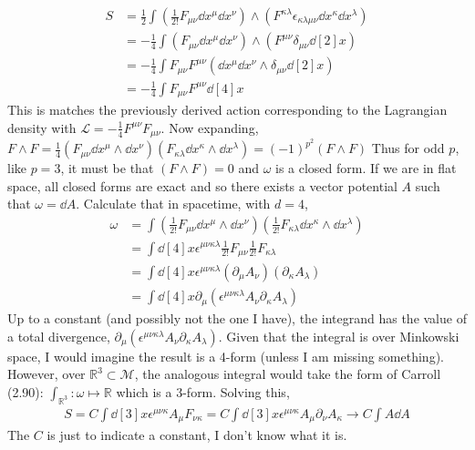 \documentclass[10pt]{scrartcl}
\begin{document}
\begin{align}
S &= \frac{1}{2}\int \left(\frac{1}{2!}F_{\mu\nu}\dd{x^{\mu}}\dd{x^{\nu}}\right) \wedge \left(F^{\kappa\lambda} \epsilon_{\kappa\lambda\mu\nu}\dd{x^{\kappa}}\dd{x^{\lambda}}\right)\\
&= -\frac{1}{4}\int \left(F_{\mu\nu}\dd{x^{\mu}}\dd{x^{\nu}}\right) \wedge \left(F^{\mu\nu}\delta_{\mu\nu}\dd[2]{x}\right) \\
&= -\frac{1}{4}\int F_{\mu\nu}F^{\mu\nu} (\dd{x^{\mu}}\dd{x^{\nu}}\wedge \delta_{\mu\nu}\dd[2]{x})\\
&= -\frac{1}{4}\int F_{\mu\nu}F^{\mu\nu}\dd[4]{x}
\end{align}
This is matches the previously derived action corresponding to the Lagrangian density with $\mathcal{L} = - \frac{1}{4}F^{\mu\nu}F_{\mu\nu}$. Now expanding, $F\wedge F = \frac{1}{4}(F_{\mu\nu}\dd{x^\mu}\wedge\dd{x^{\nu}})	(F_{\kappa\lambda}\dd{x^\kappa}\wedge\dd{x^{\lambda}})= (-1)^{p^2}(F\wedge F)$
Thus for odd $p$, like $p=3$, it must be that $(F\wedge F) = 0$ and $\omega$ is a closed form. If we are in flat space, all closed forms are exact and so there exists a vector potential $A$ such that $\omega=\dd{A}$. Calculate that in spacetime, with $d=4$, 
\begin{align}
\omega &= \int(\frac{1}{2!}F_{\mu\nu}\dd{x^\mu}\wedge\dd{x^{\nu}})	(\frac{1}{2!}F_{\kappa\lambda}\dd{x^\kappa}\wedge\dd{x^{\lambda}})\\
&= \int \dd[4]{x}\epsilon^{\mu\nu\kappa\lambda}\frac{1}{2!}F_{\mu\nu}\frac{1}{2!}F_{\kappa\lambda}\\
&= \int \dd[4]{x}\epsilon^{\mu\nu\kappa\lambda}(\partial_\mu A_\nu)(\partial_\kappa A_\lambda)\\
&= \int \dd[4]{x}\partial_\mu(\epsilon^{\mu\nu\kappa\lambda}A_\nu\partial_\kappa A_\lambda)
\end{align}
Up to a constant (and possibly not the one I have), the integrand has the value of a total divergence, $\partial_\mu(\epsilon^{\mu\nu\kappa\lambda} A_\nu \partial_\kappa A_\lambda)$. Given that the integral is over Minkowski space, I would imagine the result is a 4-form (unless I am missing something). However, over $\mathbb{R}^3\subset \mathcal{M}$, the analogous integral would take the form of Carroll (2.90): $\int_{\mathbb{R}^3}:\omega\mapsto \mathbb{R}$ which is a 3-form. Solving this,
\begin{align}
S = C\int \dd[3]{x}\epsilon^{\mu\nu\kappa} A_{\mu} F_{\nu\kappa}	 = C\int \dd[3]{x}\epsilon^{\mu\nu\kappa}A_\mu \partial_{\nu} A_\kappa \rightarrow C\int A\dd{A}
\end{align}
The $C$ is just to indicate a constant, I don't know what it is.
\end{document}
